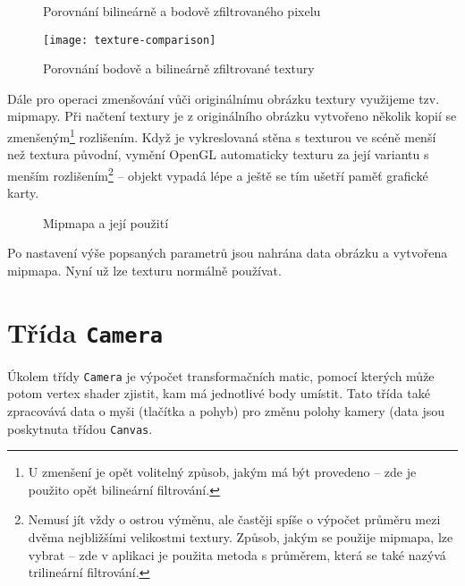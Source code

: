 \documentclass[a4paper, 11pt]{report}
\begin{document}
\begin{figure}[h]
    \centering
    \qquad
    \caption[Porovnání bodově a bilineárně zfiltrovaného pixelu]{Porovnání bilineárně a bodově zfiltrovaného pixelu~\cite{pic:colorfilter}}
\end{figure}
\begin{figure}[H]
    \centering
    \texttt{[image: texture-comparison]}
    \caption[Porovnání bodově a bilineárně zfiltrované textury]{Porovnání bodově a bilineárně zfiltrované textury~\cite{pic:texfilter}}
\end{figure}

Dále pro operaci zmenšování vůči originálnímu obrázku textury využijeme tzv. mipmapy. Při načtení textury je z originálního obrázku vytvořeno několik kopií se zmenšeným\footnote{U zmenšení je opět volitelný způsob, jakým má být provedeno -- zde je použito opět bilineární filtrování.} rozlišením. Když je vykreslovaná stěna s texturou ve scéně menší než textura původní, vymění OpenGL automaticky texturu za její variantu s menším rozlišením\footnote{Nemusí jít vždy o ostrou výměnu, ale častěji spíše o výpočet průměru mezi dvěma nejbližšími velikostmi textury. Způsob, jakým se použije mipmapa, lze vybrat -- zde v aplikaci je použita metoda s průměrem, která se také nazývá trilineární filtrování.} -- objekt vypadá lépe a ještě se tím ušetří paměť grafické karty.

\begin{figure}[h]
    \centering
    \qquad
    \caption{Mipmapa a její použití}
\end{figure}

Po nastavení výše popsaných parametrů jsou nahrána data obrázku a vytvořena mipmapa. Nyní už lze texturu normálně používat.

\section{\label{kamera}Třída \texttt{Camera}}
Úkolem třídy \texttt{Camera} je výpočet transformačních matic, pomocí kterých může potom vertex shader zjistit, kam má jednotlivé body umístit. Tato třída také zpracovává data o myši (tlačítka a pohyb) pro změnu polohy kamery (data jsou poskytnuta třídou \texttt{Canvas}.
\end{document}
